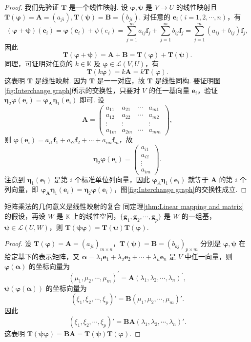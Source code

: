 \documentclass[12pt, a4paper,newtx]{ctexart}
\begin{document}
\begin{proof}
	我们先验证 $\bm T$ 是一个线性映射. 设 $\bm{\varphi}, \bm\psi$ 是 $V \rightarrow U$ 的线性映射且 $\bm{T}(\bm{\varphi}) = \bm A = (a_{ji}), \bm{T}(\bm\psi) = \bm B = (b_{ji})$. 对任意的 $\bm e_i (i = 1, 2, \cdots, n)$，有
	\[
	(\bm{\varphi} + \bm\psi)(\bm e_i) = \bm{\varphi}(\bm e_i) + \psi(e_i) 
	= \sum_{j=1}^{m} a_{ij}\bm f_j + \sum_{j=1}^{m} b_{ij}\bm f_j 
	= \sum_{j=1}^{m} (a_{ij} + b_{ij})\bm f_j,
	\]
	因此
	\[
	\bm{T}(\bm{\varphi} + \bm \psi) = \bm A + \bm B = \bm{T}(\bm{\varphi}) + \bm{T}(\bm\psi).
	\]
	同理，可证明对任意的 $k \in \mathbb{K}$ 及 $\bm{\varphi} \in \mathcal{L}(V, U)$，有
	\[
	\bm{T}(k\bm{\varphi}) = k\bm A = k\bm{T}(\bm{\varphi}).
	\]
	这表明 $\bm{T}$ 是线性映射. 因为 $\bm{T}$ 是一一对应，故 $\bm{T}$ 是线性同构. 
	要证明图\ref{fig:Interchange graph}所示的交换性，只要对 $V$ 的任一基向量 $\bm e_i$，验证 $\bm\eta_2 \bm\varphi(\bm e_i) = \bm\varphi_{\bm A}\bm\eta_1(\bm e_i)$ 即可. 设
	\[
	\bm A = \begin{pmatrix}
		a_{11} & a_{21} & \cdots & a_{m1} \\
		a_{12} & a_{22} & \cdots & a_{m2} \\
		\vdots & \vdots & & \vdots \\
		a_{1m} & a_{2m} & \cdots & a_{mm}
	\end{pmatrix},
	\]
	则 $\bm\varphi(\bm e_i) = a_{i1}\bm f_1 + a_{i2}\bm f_2 + \cdots + a_{im}\bm f_m$，故
	\[\bm\eta_2 \bm\varphi(\bm e_i) = \begin{pmatrix}
		a_{i1} \\
		a_{i2} \\
		\vdots \\
		a_{im}
	\end{pmatrix}.
	\]
	注意到 $\bm\eta_1(\bm e_i)$ 是第 $i$ 个标准单位列向量，因此 $\bm\varphi_A\bm\eta_1(\bm e_i)$ 就等于 $\bm A$ 的第 $i$ 个列向量，即 $\bm\varphi_{\bm A}\bm\eta_1(\bm e_i) =\bm\eta_2 \bm\varphi(\bm e_i)$，图\ref{fig:Interchange graph}的交换性成立. 
\end{proof}
\begin{theorem}{矩阵乘法的几何意义是线性映射的复合}{}
	同定理\ref{thm:Linear mapping and matrix}的假设，再设 $W$ 是 $\mathbb{K}$ 上的线性空间，$\{\bm g_1, \bm g_2, \cdots, \bm g_p\}$ 是 $W$ 的一组基，$\bm \psi \in \mathcal{L}(U, W)$，则 $\bm T(\bm{\psi \varphi}) = \bm T(\bm\psi)\bm T(\bm\varphi)$. 
\end{theorem}
\begin{proof}
	设 $\bm T(\bm\varphi) = \bm A = (a_{ji})_{m \times n}$，$\bm T(\bm\psi) = \bm B = (b_{kj})_{p \times m}$ 分别是 $\bm\varphi, \bm\psi$ 在给定基下的表示矩阵，又 $\bm\alpha = \lambda_1\bm e_1 + \lambda_2\bm e_2 + \cdots + \lambda_n\bm e_n$ 是 $V$ 中任一向量，则 $\bm\varphi(\bm\alpha)$ 的坐标向量为
	\[(\mu_1,\mu_2,\cdots,\mu_m)^\prime
	= \bm A (\lambda_1,\lambda_2,\cdots,\lambda_n)^\prime,
	\]
	$\bm\psi(\bm\varphi(\bm\alpha))$ 的坐标向量为
	\[(\xi_1,\xi_2,\cdots,\xi_p)'
	= \bm B (\mu_1,\mu_2,\cdots,\mu_m)'.
	\]
	因此
	\[(\xi_1,\xi_2,\cdots,\xi_p)'= \bm{BA} (\lambda_1,\lambda_2,\cdots,\lambda_n)'.\]
	这表明 $\bm T(\bm{\psi\varphi}) = \bm{BA} = \bm T(\bm\psi)\bm T(\bm\varphi).$
\end{proof}
\end{document}
